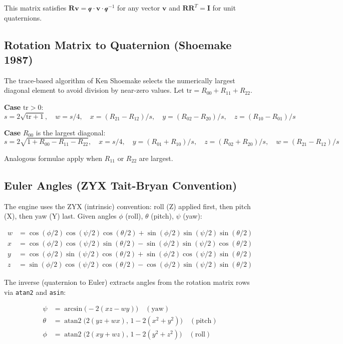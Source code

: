 \documentclass[12pt, a4paper]{report}
\theoremstyle{definition}
\theoremstyle{remark}
\begin{document}
This matrix satisfies $\mathbf{R}\mathbf{v} = \mathcal{q} \cdot \mathbf{v} \cdot \mathcal{q}^{-1}$
for any vector $\mathbf{v}$ and $\mathbf{R}\mathbf{R}^T = \mathbf{I}$
for unit quaternions.

\subsection{Rotation Matrix to Quaternion (Shoemake 1987)}

The trace-based algorithm of Ken Shoemake selects the numerically largest
diagonal element to avoid division by near-zero values.
Let $\text{tr} = R_{00} + R_{11} + R_{22}$.

\textbf{Case} $\text{tr} > 0$:
\[
s = 2\sqrt{\text{tr}+1}, \quad
w = s/4, \quad
x = (R_{21}-R_{12})/s, \quad
y = (R_{02}-R_{20})/s, \quad
z = (R_{10}-R_{01})/s
\]

\textbf{Case} $R_{00}$ is the largest diagonal:
\[
s = 2\sqrt{1+R_{00}-R_{11}-R_{22}}, \quad
x = s/4, \quad
y = (R_{01}+R_{10})/s, \quad
z = (R_{02}+R_{20})/s, \quad
w = (R_{21}-R_{12})/s
\]

Analogous formulae apply when $R_{11}$ or $R_{22}$ are largest.

\subsection{Euler Angles (ZYX Tait-Bryan Convention)}

The engine uses the ZYX (intrinsic) convention: roll (Z) applied first,
then pitch (X), then yaw (Y) last.
Given angles $\phi$ (roll), $\theta$ (pitch), $\psi$ (yaw):

\begin{align}
  w &= \cos(\phi/2)\cos(\psi/2)\cos(\theta/2) + \sin(\phi/2)\sin(\psi/2)\sin(\theta/2) \\
  x &= \cos(\phi/2)\cos(\psi/2)\sin(\theta/2) - \sin(\phi/2)\sin(\psi/2)\cos(\theta/2) \\
  y &= \cos(\phi/2)\sin(\psi/2)\cos(\theta/2) + \sin(\phi/2)\cos(\psi/2)\sin(\theta/2) \\
  z &= \sin(\phi/2)\cos(\psi/2)\cos(\theta/2) - \cos(\phi/2)\sin(\psi/2)\sin(\theta/2)
\end{align}

The inverse (quaternion to Euler) extracts angles from the rotation matrix
rows via \texttt{atan2} and \texttt{asin}:

\begin{align}
  \psi  &= \arcsin\!\bigl(-2(xz - wy)\bigr) \quad (\text{yaw}) \\
  \theta &= \operatorname{atan2}\!\bigl(2(yz+wx),\, 1-2(x^2+y^2)\bigr) \quad (\text{pitch}) \\
  \phi  &= \operatorname{atan2}\!\bigl(2(xy+wz),\, 1-2(y^2+z^2)\bigr) \quad (\text{roll})
\end{align}
\end{document}
